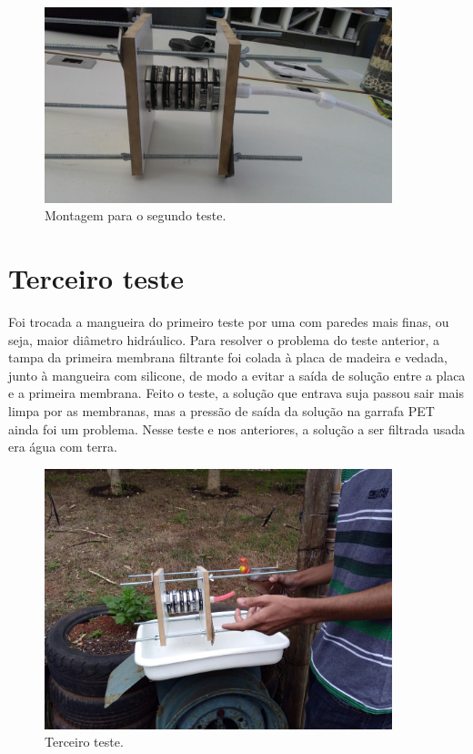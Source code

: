 \begin{figure}[H]
  \centering
  \includegraphics[width=0.9\textwidth]{figuras/segundo_teste.png}
  \caption{Montagem para o segundo teste.\label{fig:segundo_teste}}
\end{figure}


\section{Terceiro teste}\label{sec:terceiro_teste}

Foi trocada a mangueira do primeiro teste por uma com paredes mais finas, ou
seja, maior diâmetro hidráulico. Para resolver o problema do teste anterior, a
tampa da primeira membrana filtrante foi colada à placa de madeira e vedada,
junto à mangueira com silicone, de modo a evitar a saída de solução entre a
placa e a primeira membrana. Feito o teste, a solução que entrava suja passou
sair mais limpa por as membranas, mas a pressão de saída da solução na garrafa
PET ainda foi um problema. Nesse teste e nos anteriores, a solução a ser
filtrada usada era água com terra.

\begin{figure}[H]
  \centering
  \includegraphics[width=0.9\textwidth]{figuras/terceiro_teste.png}
  \caption{Terceiro teste.\label{fig:terceiro_teste}}
\end{figure}


